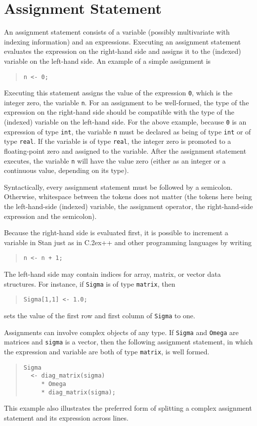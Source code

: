 \documentclass[10pt]{report}
\newcommand{\Stan}{Stan\xspace}
\newcommand*{\Cpp}{C\raise.2ex\hbox{\footnotesize ++}\xspace} %
\newcommand{\code}[1]{{\tt #1}}
\begin{document}
\section{Assignment Statement}

An assignment statement consists of a variable (possibly multivariate
with indexing information) and an expressions.  Executing an
assignment statement evaluates the expression on the right-hand side
and assigns it to the (indexed) variable on the left-hand side.  An
example of a simple assignment is
%
\begin{quote}
\code{n <- 0;}
\end{quote}
%
Executing this statement assigns the value of the expression \code{0},
which is the integer zero, the variable \code{n}.  For an assignment
to be well-formed, the type of the expression on the right-hand side
should be compatible with the type of the (indexed) variable on the
left-hand side.  For the above example, because \code{0} is an
expression of type \code{int}, the variable \code{n} must be declared
as being of type \code{int} or of type \code{real}.  If the variable
is of type \code{real}, the integer zero is promoted to a
floating-point zero and assigned to the variable.  After the
assignment statement executes, the variable \code{n} will have the
value zero (either as an integer or a continuous value, depending on
its type).

Syntactically, every assignment statement must be followed by a
semicolon.  Otherwise, whitespace between the tokens does not matter
(the tokens here being the left-hand-side (indexed) variable, the
assignment operator, the right-hand-side expression and the
semicolon).

Because the right-hand side is evaluated first, it is possible to
increment a variable in \Stan just as in \Cpp and other programming
languages by writing
%
\begin{quote}
\code{n <- n + 1;}
\end{quote}

The left-hand side may contain indices for array, matrix, or vector
data structures.  For instance, if \code{Sigma} is of type
\code{matrix}, then 
%
\begin{quote}
\code{Sigma[1,1] <- 1.0;}
\end{quote}
%
sets the value of the first row and first column of \code{Sigma} to one.

Assignments can involve complex objects of any type.  If \code{Sigma}
and \code{Omega} are matrices and \code{sigma} is a vector, then the
following assignment statement, in which the expression and variable
are both of type \code{matrix}, is well formed.
%
\begin{quote}
\begin{Verbatim}
Sigma
  <- diag_matrix(sigma) 
     * Omega 
     * diag_matrix(sigma);
\end{Verbatim}
\end{quote}
%
This example also illustrates the preferred form of splitting a
complex assignment statement and its expression across lines.
\end{document}
